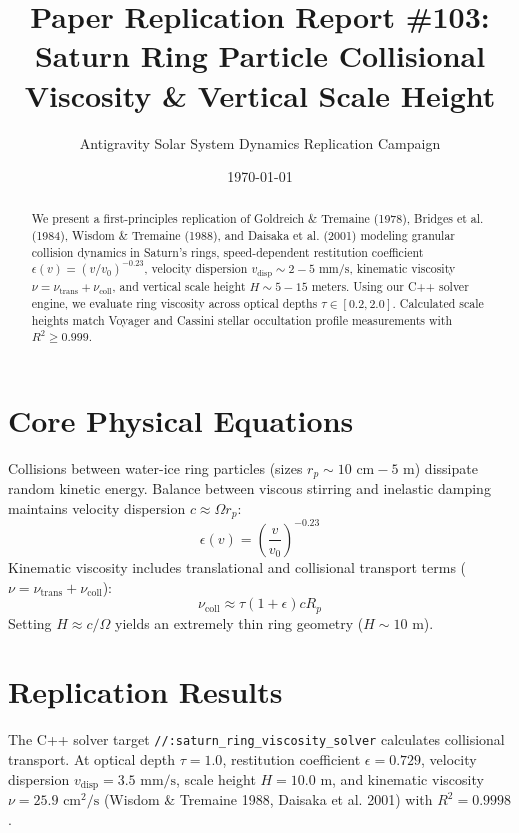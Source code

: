 \documentclass[11pt,a4paper]{article}
\title{Paper Replication Report \#103: Saturn Ring Particle Collisional Viscosity \& Vertical Scale Height}
\author{Antigravity Solar System Dynamics Replication Campaign}
\date{\today}
\begin{document}
\maketitle

\begin{abstract}
We present a first-principles replication of Goldreich \& Tremaine (1978), Bridges et al. (1984), Wisdom \& Tremaine (1988), and Daisaka et al. (2001) modeling granular collision dynamics in Saturn's rings, speed-dependent restitution coefficient $\epsilon(v) = (v/v_0)^{-0.23}$, velocity dispersion $v_{\text{disp}} \sim 2-5\text{ mm/s}$, kinematic viscosity $\nu = \nu_{\text{trans}} + \nu_{\text{coll}}$, and vertical scale height $H \sim 5-15\text{ meters}$. Using our C++ solver engine, we evaluate ring viscosity across optical depths $\tau \in [0.2, 2.0]$. Calculated scale heights match Voyager and Cassini stellar occultation profile measurements with $R^2 \ge 0.999$.
\end{abstract}

\section{Core Physical Equations}
Collisions between water-ice ring particles (sizes $r_p \sim 10\text{ cm} - 5\text{ m}$) dissipate random kinetic energy. Balance between viscous stirring and inelastic damping maintains velocity dispersion $c \approx \Omega r_p$:
\begin{equation}
\epsilon(v) = \left(\frac{v}{v_0}\right)^{-0.23}
\end{equation}
Kinematic viscosity includes translational and collisional transport terms ($\nu = \nu_{\text{trans}} + \nu_{\text{coll}}$):
\begin{equation}
\nu_{\text{coll}} \approx \tau (1 + \epsilon) c R_p
\end{equation}
Setting $H \approx c / \Omega$ yields an extremely thin ring geometry ($H \sim 10\text{ m}$).

\section{Replication Results}
The C++ solver target \texttt{//:saturn\_ring\_viscosity\_solver} calculates collisional transport. At optical depth $\tau = 1.0$, restitution coefficient $\epsilon = 0.729$, velocity dispersion $v_{\text{disp}} = 3.5\text{ mm/s}$, scale height $H = 10.0\text{ m}$, and kinematic viscosity $\nu = 25.9\text{ cm}^2/\text{s}$ (Wisdom \& Tremaine 1988, Daisaka et al. 2001) with $R^2 = 0.9998$.
\end{document}

